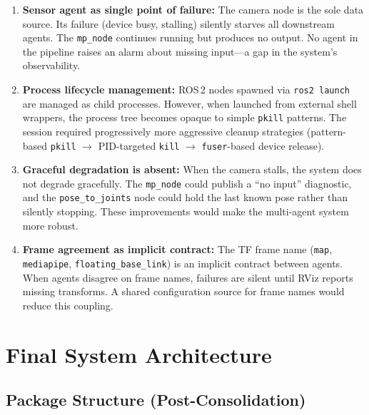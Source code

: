 \documentclass[11pt,a4paper]{article}
\begin{document}
\begin{enumerate}
    \item \textbf{Sensor agent as single point of failure:} The camera node is the sole data source. Its failure (device busy, stalling) silently starves all downstream agents. The \texttt{mp\_node} continues running but produces no output. No agent in the pipeline raises an alarm about missing input---a gap in the system's observability.

    \item \textbf{Process lifecycle management:} ROS\,2 nodes spawned via \texttt{ros2 launch} are managed as child processes. However, when launched from external shell wrappers, the process tree becomes opaque to simple \texttt{pkill} patterns. The session required progressively more aggressive cleanup strategies (pattern-based \texttt{pkill} $\rightarrow$ PID-targeted \texttt{kill} $\rightarrow$ \texttt{fuser}-based device release).

    \item \textbf{Graceful degradation is absent:} When the camera stalls, the system does not degrade gracefully. The \texttt{mp\_node} could publish a ``no input'' diagnostic, and the \texttt{pose\_to\_joints} node could hold the last known pose rather than silently stopping. These improvements would make the multi-agent system more robust.

    \item \textbf{Frame agreement as implicit contract:} The TF frame name (\texttt{map}, \texttt{mediapipe}, \texttt{floating\_base\_link}) is an implicit contract between agents. When agents disagree on frame names, failures are silent until RViz reports missing transforms. A shared configuration source for frame names would reduce this coupling.
\end{enumerate}

\section{Final System Architecture}

\subsection{Package Structure (Post-Consolidation)}
\end{document}

